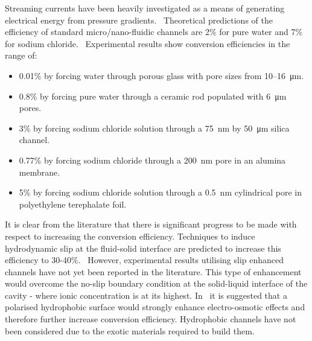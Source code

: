 \documentclass[10pt,final,journal]{IEEEtran}
\begin{document}
    Streaming currents have been heavily investigated as a means of generating electrical energy from pressure gradients.~\cite{Chang2009,Daiguji2006,Daiguji2004b,Davidson2008a,Davidson2008,CherngHon2012,Jiao2014,Lu2006,Olthuis2005,Osterle1964,Pennathur2007,Ren2008a,VanderHeyden2006,Heyden2007,Xie2008,Yang2003}
    Theoretical predictions of the efficiency of standard micro/nano-fluidic channels are 2\% for pure water and 7\% for sodium chloride.~\cite{VanderHeyden2006}
    Experimental results show conversion efficiencies in the range of:
    \begin{itemize}
        \item 0.01\% by forcing water through porous glass with pore sizes from 10\thinspace--\SI{16}{\micro\metre}.~\cite{Yang2003}
        \item 0.8\% by forcing pure water through a ceramic rod populated with \SI{6}{\micro\metre} pores.~\cite{Yang2004}
        \item 3\% by forcing sodium chloride solution through a \SI{75}{\nano\metre} by \SI{50}{\micro\metre} silica channel.~\cite{Heyden2007}
        \item 0.77\% by forcing sodium chloride through a \SI{200}{\nano\metre} pore in an alumina membrane.~\cite{Lu2006}
        \item 5\% by forcing sodium chloride solution through a \SI{0.5}{\nano\metre} cylindrical pore in polyethylene terephalate foil.~\cite{Xie2008}
    \end{itemize}

    It is clear from the literature that there is significant progress to be made with respect to increasing the conversion efficiency.
    Techniques to induce hydrodynamic slip at the fluid-solid interface are predicted to increase this efficiency to 30-40\%.~\cite{Davidson2008a, Ren2008a}
    However, experimental results utilising slip enhanced channels have not yet been reported in the literature.
    This type of enhancement would overcome the no-slip boundary condition at the solid-liquid interface of the cavity - where ionic concentration is at its highest.
    In~\cite{Joly2006} it is suggested that a polarised hydrophobic surface would strongly enhance electro-osmotic effects and therefore further increase conversion efficiency.
    Hydrophobic channels have not been considered due to the exotic materials required to build them.
\end{document}

